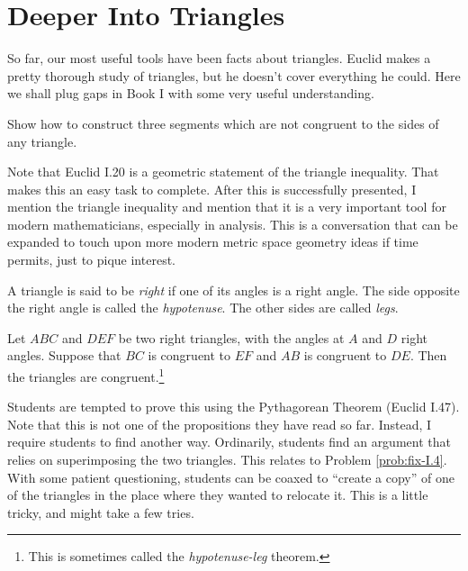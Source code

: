 \chapter{Deeper Into Triangles}\label{section:triangles}

So far, our most useful tools have been facts about triangles. Euclid makes a pretty thorough study of triangles, but he doesn't cover everything he could. 
Here we shall plug  gaps in Book I with some very useful understanding.

\begin{problem}
\label{prob:triangle-inequality}
Show how to construct three segments which are not congruent to the sides of any triangle.
\end{problem}

\begin{annotation}
{
\color{blue}
Note that Euclid I.20 is a geometric statement of the triangle inequality. That makes this an easy task to complete. After this is successfully presented, I mention the triangle inequality and mention that it is a very important tool for modern mathematicians, especially in analysis. This is a conversation that can be expanded to touch upon more modern metric space geometry ideas if time permits, just to pique interest.
}
\end{annotation}

\begin{definition}
\label{defn:right-triangles}
A triangle is said to be \emph{right} if one of its angles is a right angle. 
The side opposite the right angle is called the \emph{hypotenuse}. 
The other sides are called \emph{legs}.
\end{definition}

\begin{conjecture}
\label{conj:RASS}
Let $ABC$ and $DEF$ be two right triangles, with the angles at $A$ and $D$ right angles. 
Suppose that $BC$ is congruent to $EF$ and $AB$ is congruent to $DE$. 
Then the triangles are congruent.\footnote{This is sometimes called the \emph{hypotenuse-leg} theorem.}
\end{conjecture}

\begin{annotation}
{
\color{blue}
Students are tempted to prove this using the Pythagorean Theorem (Euclid I.47). Note that this is not one of the propositions they have read so far. Instead, I require students to find another way. Ordinarily, students find an argument that relies on superimposing the two triangles. This relates to Problem \ref{prob:fix-I.4}. With some patient questioning, students can be coaxed to ``create a copy'' of one of the triangles in the place where they wanted to relocate it. This is a little tricky, and might take a few tries. 
}
\end{annotation}

